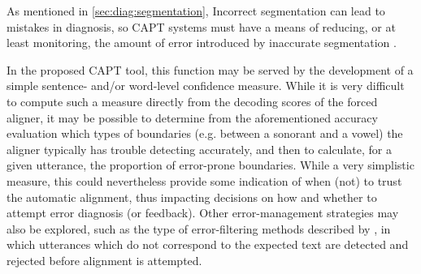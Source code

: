 	\TODO{}
	
		
	
	As mentioned in \cref{sec:diag:segmentation}, 
	Incorrect segmentation can lead to mistakes in diagnosis, so CAPT systems must have a means of reducing, or at least monitoring, the amount of error introduced by inaccurate segmentation \citep{Eskenazi2009}. 
	
	In the proposed CAPT tool, this function may be served by the development of a simple sentence- and/or word-level confidence measure. 
	While it is very difficult to compute such a measure directly from the decoding scores of the forced aligner, it may be possible to determine from the aforementioned accuracy evaluation which types of boundaries (e.g. between a sonorant and a vowel) the aligner typically has trouble detecting accurately, and then to calculate, for a given utterance, the proportion of error-prone boundaries. While a very simplistic measure, this could nevertheless provide some indication of when (not) to trust the automatic alignment, thus impacting decisions on how and whether to attempt error diagnosis (or feedback).
	Other error-management strategies may also be explored, such as the type of error-filtering methods described by \textcite{Mesbahi2011,Bonneau2012,Orosanu2012}, in which utterances which do not correspond to the expected text are detected and rejected before alignment is attempted.
	